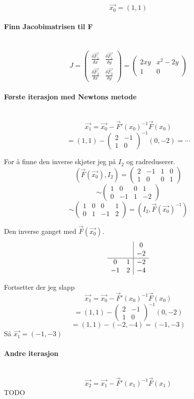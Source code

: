 $$\vec{x_0} = (1,1)$$



\paragraph{Finn Jacobimatrisen til F} \mbox{} \\
$$J = \begin{pmatrix}
      \frac{\delta\vec{F_1}}{\delta x} & \frac{\delta\vec{F_1}}{\delta y} \\
      \frac{\delta\vec{F_2}}{\delta x} & \frac{\delta\vec{F_2}}{\delta y}
      \end{pmatrix}
    = \begin{pmatrix}
      2xy & x^2-2y \\
      1   & 0
      \end{pmatrix}$$



\paragraph{Første iterasjon med Newtons metode} \mbox{} \\
$$\vec{x_1} = \vec{x_0} - \vec{F}'(x_0)^{-1}\vec{F}(x_0)$$
$$ = (1,1) - \begin{pmatrix}2&-1\\1&0\end{pmatrix}^{-1} (0,-2) = \cdots$$

For å finne den inverse skjøter jeg på $I_2$ og radreduserer.
$$(\vec{F}(\vec{x_0}),I_2) =
  \begin{pmatrix} 2 & -1 & 1 & 0 \\ 1 & 0 & 0 & 1 \end{pmatrix}$$
$$\sim \begin{pmatrix} 1 & 0 & 0 & 1 \\ 0 & -1 & 1 & -2 \end{pmatrix}$$
$$\sim \begin{pmatrix} 1 & 0 & 0 & 1 \\ 0 & 1 & -1 & 2 \end{pmatrix}
  = (I_2, \vec{F}(\vec{x_0})^{-1})$$

Den inverse ganget med $\vec{F}(\vec{x_0})$.
$$\begin{array}{c c|c}
     &   &  0 \\
     &   & -2 \\
  \hline
   0 & 1 & -2 \\
  -1 & 2 & -4
  \end{array}$$

Fortsetter der jeg slapp
$$\vec{x_1} = \vec{x_0} - \vec{F}'(x_0)^{-1}\vec{F}(x_0)$$
$$ = (1,1) - \begin{pmatrix}2&-1\\1&0\end{pmatrix}^{-1} (0,-2)$$
$$ = (1,1) - (-2,-4) = (-1,-3)$$
Så $\vec{x_1} = (-1,-3)$



\paragraph{Andre iterasjon} \mbox{} \\
$$\vec{x_2} = \vec{x_1} - \vec{F}'(x_1)^{-1}\vec{F}(x_1)$$
TODO
